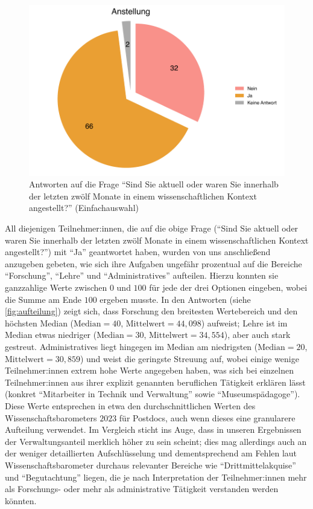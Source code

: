 \documentclass{scrartcl}
\begin{document}
\begin{figure}[t]
   \includegraphics[width=1\textwidth]{anstellung.pdf}
   \caption{Antworten auf die Frage \enquote{Sind Sie aktuell oder waren Sie innerhalb der letzten zwölf Monate in einem wissenschaftlichen Kontext angestellt?} (Einfachauswahl)}
   \label{fig:anstellung}
\end{figure}

All diejenigen Teilnehmer:innen, die auf die obige Frage (\enquote{Sind Sie aktuell oder waren Sie innerhalb der letzten zwölf Monate in einem wissenschaftlichen Kontext angestellt?}) mit \enquote{Ja} geantwortet haben, wurden von uns anschließend anzugeben gebeten, wie sich ihre Aufgaben ungefähr prozentual auf die Bereiche \enquote{Forschung}, \enquote{Lehre} und \enquote{Administratives} aufteilen.
Hierzu konnten sie ganzzahlige Werte zwischen $0$ und $100$ für jede der drei Optionen eingeben, wobei die Summe am Ende $100$ ergeben musste.
In den Antworten (siehe \autoref{fig:aufteilung}) zeigt sich, dass Forschung den breitesten Wertebereich und den höchsten Median ($\text{Median} = 40$, $\text{Mittelwert} = 44,098$) aufweist; Lehre ist im Median etwas niedriger ($\text{Median} = 30$, $\text{Mittelwert} = 34,554$), aber auch stark gestreut.
Administratives liegt hingegen im Median am niedrigsten ($\text{Median} = 20$, $\text{Mittelwert} = 30,859$) und weist die geringste Streuung auf, wobei einige wenige Teilnehmer:innen extrem hohe Werte angegeben haben, was sich bei einzelnen Teilnehmer:innen aus ihrer explizit genannten beruflichen Tätigkeit erklären lässt (konkret \enquote{Mitarbeiter in Technik und Verwaltung} sowie \enquote{Museumspädagoge}).
Diese Werte entsprechen in etwa den durchschnittlichen Werten des Wissenschaftsbarometers $2023$ für Postdocs,\autocite[Vgl.][S.~14--15]{fabian_barometer_2024} auch wenn dieses eine granularere Aufteilung verwendet.
Im Vergleich sticht ins Auge, dass in unseren Ergebnissen der Verwaltungsanteil merklich höher zu sein scheint; dies mag allerdings auch an der weniger detaillierten Aufschlüsselung und dementsprechend am Fehlen laut Wissenschaftsbarometer durchaus relevanter Bereiche wie \enquote{Drittmittelakquise} und \enquote{Begutachtung} liegen, die je nach Interpretation der Teilnehmer:innen mehr als Forschungs- oder mehr als administrative Tätigkeit verstanden werden könnten.
\end{document}
